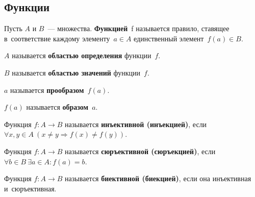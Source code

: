 \subsection{Функции}
Пусть $A$ и $B$~--- множества.
\textbf{Функцией}~f называется правило, ставящее в~соответствие каждому элементу~$a \in A$ единственный элемент~$f(a) \in B$.

$A$ называется \textbf{областью определения} функции~$f$.

$B$ называется \textbf{областью значений} функции~$f$.

$a$ называется \textbf{прообразом}~$f(a)$.

$f(a)$ называется \textbf{образом}~$a$.

Функция $f \colon A \to B$ называется \textbf{инъективной (инъекцией)}, если
$\forall x, y \in A	\ \allowbreak (x \neq y \Rightarrow f(x) \neq f(y))$.

Функция $f \colon A \to B$ называется \textbf{сюръективной (сюръекцией)}, если
$\forall b \in B \ \allowbreak \exists a \in A \colon \allowbreak f(a) = b$.

Функция $f \colon A \to B$ называется \textbf{биективной (биекцией)}, если она инъективная
и~сюръективная.